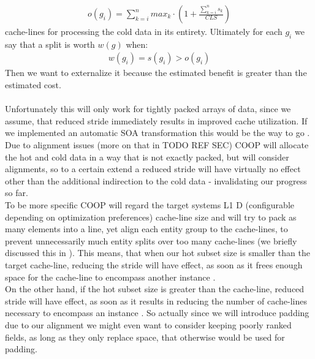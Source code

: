 \begin{align}
	o(g_i) = \sum_{k=i}^{n}max_k\cdot(1+\frac{\sum_{k=i}^{n}s_k}{CLS})
\end{align}
cache-lines for processing the cold data in its entirety. Ultimately for each $g_i$ we say that a split is worth $w(g)$ when:
\begin{align}
	w(g_i) = s(g_i) > o(g_i)
\end{align}
Then we want to externalize it because the estimated benefit is greater than the estimated cost.\\\\
Unfortunately this will only work for tightly packed arrays of data, since we assume, that reduced stride immediately results in improved cache utilization. If we implemented an automatic SOA transformation this would be the way to go . Due to alignment issues (more on that in TODO REF SEC) COOP will allocate the hot and cold data in a way that is not exactly packed, but will consider alignments, so to a certain extend a reduced stride will have virtually no effect other than the additional indirection to the cold data - invalidating our progress so far.\\
To be more specific COOP will regard the target systems L1 D (configurable depending on optimization preferences) cache-line size and will try to pack as many elements into a line, yet align each entity group to the cache-lines, to prevent unnecessarily much entity splits over too many cache-lines  (we briefly discussed this in ). This means, that when our hot subset size is smaller than the target cache-line, reducing the stride will have effect, as soon as it frees enough space for the cache-line to encompass another instance .\\
On the other hand, if the hot subset size is greater than the cache-line, reduced stride will have effect, as soon as it results in reducing the number of cache-lines necessary to encompass an instance . So actually since we will introduce padding due to our alignment we might even want to consider keeping poorly ranked fields, as long as they only replace space, that otherwise would be used for padding.

